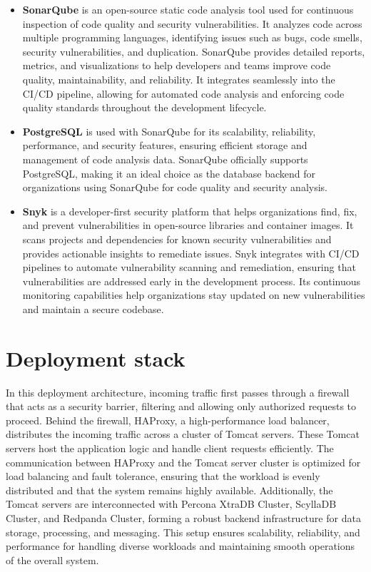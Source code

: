 \documentclass[12pt,a4paper,oneside]{report}
\begin{document}
\begin{itemize}
\item \textbf{SonarQube} is an open-source static code analysis tool used for continuous inspection of code quality and security vulnerabilities. It analyzes code across multiple programming languages, identifying issues such as bugs, code smells, security vulnerabilities, and duplication. SonarQube provides detailed reports, metrics, and visualizations to help developers and teams improve code quality, maintainability, and reliability. It integrates seamlessly into the CI/CD pipeline, allowing for automated code analysis and enforcing code quality standards throughout the development lifecycle.

\item \textbf{PostgreSQL} is used with SonarQube for its scalability, reliability, performance, and security features, ensuring efficient storage and management of code analysis data. SonarQube officially supports PostgreSQL, making it an ideal choice as the database backend for organizations using SonarQube for code quality and security analysis.

 
\item \textbf{Snyk} is a developer-first security platform that helps organizations find, fix, and prevent vulnerabilities in open-source libraries and container images. It scans projects and dependencies for known security vulnerabilities and provides actionable insights to remediate issues. Snyk integrates with CI/CD pipelines to automate vulnerability scanning and remediation, ensuring that vulnerabilities are addressed early in the development process. Its continuous monitoring capabilities help organizations stay updated on new vulnerabilities and maintain a secure codebase.
\end{itemize}

\section{Deployment stack}
\par In this deployment architecture, incoming traffic first passes through a firewall that acts as a security barrier, filtering and allowing only authorized requests to proceed. Behind the firewall, HAProxy, a high-performance load balancer, distributes the incoming traffic across a cluster of Tomcat servers. These Tomcat servers host the application logic and handle client requests efficiently. The communication between HAProxy and the Tomcat server cluster is optimized for load balancing and fault tolerance, ensuring that the workload is evenly distributed and that the system remains highly available. Additionally, the Tomcat servers are interconnected with Percona XtraDB Cluster, ScyllaDB Cluster, and Redpanda Cluster, forming a robust backend infrastructure for data storage, processing, and messaging. This setup ensures scalability, reliability, and performance for handling diverse workloads and maintaining smooth operations of the overall system.
\end{document}
